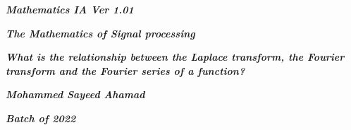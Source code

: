 

\begin{titlepage}
    \begin{center}
            
        \date{}
            
        \huge
            
        \textit{\textbf{Mathematics IA Ver 1.01}}
            
        \vspace{0.25cm}
            
        \hline
            
        \vspace{2.5cm}
            
        \textit{\textbf{The Mathematics of Signal processing}}
            
        \vspace{1cm}
            
        \LARGE
            
        \textit{\textbf{What is the relationship between the Laplace transform, the Fourier transform and the Fourier series of a function? }}
            
        \vspace{2.5cm}
            
        \Large
            
        \textit{\textbf{Mohammed Sayeed Ahamad}}
            
        \vspace{4cm}
            
        \Large
            
        \textit{\textbf{Batch of 2022}}
            
        \vspace{0.25cm}
            
        \hline
           
            
    \end{center}
\end{titlepage}




